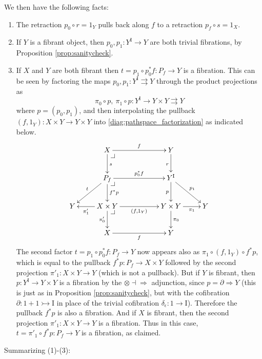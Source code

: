 \documentclass[11pt,reqno]{amsart}
\makeatletter
\newcommand{\ra}{\ensuremath{\rightarrow}}
\newcommand{\cof}{\ensuremath{\rightarrowtail}}
\renewcommand{\to}{\ensuremath{\rightarrow}}
\newcommand{\I}{\ensuremath{\mathrm{I}}}
\newcommand{\del}{\ensuremath{\partial}}
\theoremstyle{remark}
\theoremstyle{definition}
\newcommand{\pbcorner}[1][dr]{\save*!/#1-1.2pc/#1:(-1,1)@^{|-}\restore}
\makeatother
\begin{document}
We then have the following facts:
%
\begin{enumerate}
\item The retraction $p_0\circ r = 1_Y$ pulls back along $f$ to a retraction ${p_f}\circ{s}=1_X$.

\item If $Y$ is a fibrant object, then $p_0 , p_1 : Y^\I \ra Y$ are both trivial fibrations, by Proposition \ref{prop:sanitycheck}.  

\item If $X$ and $Y$ are both fibrant then $t= p_1\circ p_0^*f : P_f \ra Y$ is a fibration.  This can be seen by factoring the maps $p_0, p_1 :Y^\I \rightrightarrows  Y$ through the product projections as
\[
\pi_0\circ p,\ \pi_1\circ p : Y^\I \ra Y\times Y \rightrightarrows Y
\]
where $p = (p_0, p_1)$, and then interpolating the pullback $(f,1_Y) : X\times Y\ra Y\times Y$ into \eqref{diag:pathspace_factorization} as indicated below.
\begin{equation}\label{diag:pathspace_factorization2}
\xymatrix{
& X \ar[d]^s \ar[rr]^f \pbcorner && Y \ar[d]_r \\
& \ar[ld]_t P_f  \ar[d]^{f^*p} \ar[rr]^{p_0^*f} \pbcorner && Y^\I \ar[d]_{p} \ar[rd]^{p_1}\\
Y & \ar[l]^-{\pi'_1} X\times Y\ar[d]_-{\pi'_0} \ar[rr]_{(f,1_Y)} \pbcorner  &&  Y\times Y \ar[d]^{\pi_0} \ar[r]_-{\pi_1} & Y \\
& X \ar[rr]_f  &&  Y &
}
\end{equation}
The second factor $t = p_1\circ p_0^*f : P_f \ra Y$ now appears also as $\pi_1\circ(f,1_Y)\circ f^*p$, which is equal to the pullback $f^*p: P_f \ra X\times Y$ followed by the second projection $\pi'_1 : X\times Y \ra Y$ (which is not a pullback).  But if $Y$ is fibrant, then $p: Y^\I \ra Y\times Y$ is a fibration by the ${\otimes} \dashv {\Rightarrow}$ adjunction, since $p = \del \Rightarrow Y$ (this is just as in Proposition \ref{prop:sanitycheck}, but with the cofibration $\del : 1+1 \cof \I$ in place of the trivial cofibration $\delta_\epsilon : 1 \to \I$).
Therefore the pullback  $f^*p$ is also a fibration.  And if $X$ is fibrant, then the second projection $\pi'_1:X\times Y \ra Y$ is a fibration. Thus in this case, $t = \pi'_1\circ f^*p : P_f \ra Y$ is a fibration, as claimed.
\end{enumerate}

Summarizing (1)-(3):
\end{document}
